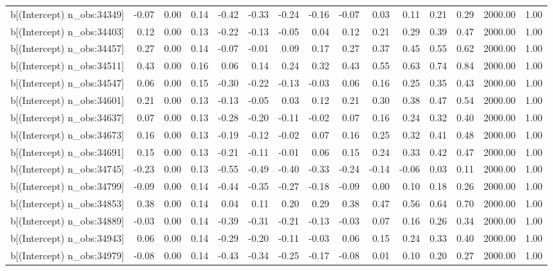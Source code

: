 \begin{table}[ht]
\begin{tabular}{rrrrrrrrrrrrrrr}
  b[(Intercept) n\_obs:34349] & -0.07 & 0.00 & 0.14 & -0.42 & -0.33 & -0.24 & -0.16 & -0.07 & 0.03 & 0.11 & 0.21 & 0.29 & 2000.00 & 1.00 \\ 
  b[(Intercept) n\_obs:34403] & 0.12 & 0.00 & 0.13 & -0.22 & -0.13 & -0.05 & 0.04 & 0.12 & 0.21 & 0.29 & 0.39 & 0.47 & 2000.00 & 1.00 \\ 
  b[(Intercept) n\_obs:34457] & 0.27 & 0.00 & 0.14 & -0.07 & -0.01 & 0.09 & 0.17 & 0.27 & 0.37 & 0.45 & 0.55 & 0.62 & 2000.00 & 1.00 \\ 
  b[(Intercept) n\_obs:34511] & 0.43 & 0.00 & 0.16 & 0.06 & 0.14 & 0.24 & 0.32 & 0.43 & 0.55 & 0.63 & 0.74 & 0.84 & 2000.00 & 1.00 \\ 
  b[(Intercept) n\_obs:34547] & 0.06 & 0.00 & 0.15 & -0.30 & -0.22 & -0.13 & -0.03 & 0.06 & 0.16 & 0.25 & 0.35 & 0.43 & 2000.00 & 1.00 \\ 
  b[(Intercept) n\_obs:34601] & 0.21 & 0.00 & 0.13 & -0.13 & -0.05 & 0.03 & 0.12 & 0.21 & 0.30 & 0.38 & 0.47 & 0.54 & 2000.00 & 1.00 \\ 
  b[(Intercept) n\_obs:34637] & 0.07 & 0.00 & 0.13 & -0.28 & -0.20 & -0.11 & -0.02 & 0.07 & 0.16 & 0.24 & 0.32 & 0.40 & 2000.00 & 1.00 \\ 
  b[(Intercept) n\_obs:34673] & 0.16 & 0.00 & 0.13 & -0.19 & -0.12 & -0.02 & 0.07 & 0.16 & 0.25 & 0.32 & 0.41 & 0.48 & 2000.00 & 1.00 \\ 
  b[(Intercept) n\_obs:34691] & 0.15 & 0.00 & 0.13 & -0.21 & -0.11 & -0.01 & 0.06 & 0.15 & 0.24 & 0.33 & 0.42 & 0.47 & 2000.00 & 1.00 \\ 
  b[(Intercept) n\_obs:34745] & -0.23 & 0.00 & 0.13 & -0.55 & -0.49 & -0.40 & -0.33 & -0.24 & -0.14 & -0.06 & 0.03 & 0.11 & 2000.00 & 1.00 \\ 
  b[(Intercept) n\_obs:34799] & -0.09 & 0.00 & 0.14 & -0.44 & -0.35 & -0.27 & -0.18 & -0.09 & 0.00 & 0.10 & 0.18 & 0.26 & 2000.00 & 1.00 \\ 
  b[(Intercept) n\_obs:34853] & 0.38 & 0.00 & 0.14 & 0.04 & 0.11 & 0.20 & 0.29 & 0.38 & 0.47 & 0.56 & 0.64 & 0.70 & 2000.00 & 1.00 \\ 
  b[(Intercept) n\_obs:34889] & -0.03 & 0.00 & 0.14 & -0.39 & -0.31 & -0.21 & -0.13 & -0.03 & 0.07 & 0.16 & 0.26 & 0.34 & 2000.00 & 1.00 \\ 
  b[(Intercept) n\_obs:34943] & 0.06 & 0.00 & 0.14 & -0.29 & -0.20 & -0.11 & -0.03 & 0.06 & 0.15 & 0.24 & 0.33 & 0.40 & 2000.00 & 1.00 \\ 
  b[(Intercept) n\_obs:34979] & -0.08 & 0.00 & 0.14 & -0.43 & -0.34 & -0.25 & -0.17 & -0.08 & 0.01 & 0.10 & 0.20 & 0.27 & 2000.00 & 1.00 \\ 

\end{tabular}
\end{table}
